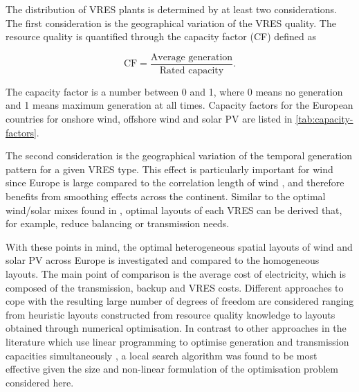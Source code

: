 \documentclass[a4paper, 5p, sort&compress]{elsarticle}%
\begin{document}
The distribution of VRES plants is determined by at least two considerations.
The first consideration is the geographical
variation of the VRES
quality. %
The resource quality is quantified through the capacity factor (CF) defined as

\begin{equation}
  \label{eq:1}
  \mbox{CF} = \frac{\mbox{Average generation}}{\mbox{Rated capacity}} .
\end{equation}

The capacity factor is a number between 0 and 1, where 0 means no
generation and 1 means maximum generation at all times. Capacity
factors for the European countries for onshore wind, offshore wind and
solar PV are listed in \cref{tab:capacity-factors}.

The second consideration is the geographical variation of the temporal
generation pattern for a given VRES type. This effect is particularly
important for wind since Europe is large compared to the correlation
length of wind %
\cite{Widen2011}, and therefore
benefits from smoothing effects across the continent. Similar to the
optimal wind/solar mixes found in \cite{Heide2010,Heide2011}, optimal
layouts of each VRES can be derived that, for example, reduce
balancing or transmission needs.

With these points in mind, the optimal heterogeneous spatial layouts
of wind and solar PV across Europe is investigated and compared to the
homogeneous layouts. The main point of comparison is the average cost
of electricity, which is composed of the transmission, backup and VRES
costs.  Different approaches to cope with the resulting large number
of degrees of freedom are considered ranging from heuristic layouts
constructed from resource quality knowledge to layouts obtained
through numerical optimisation. In contrast to other approaches in the
literature which use linear programming to optimise
generation and transmission capacities simultaneously \cite{Czisch,Hagspiel}, a
local search algorithm was found to be most effective given the size
and non-linear formulation of the optimisation problem considered here.
\end{document}
